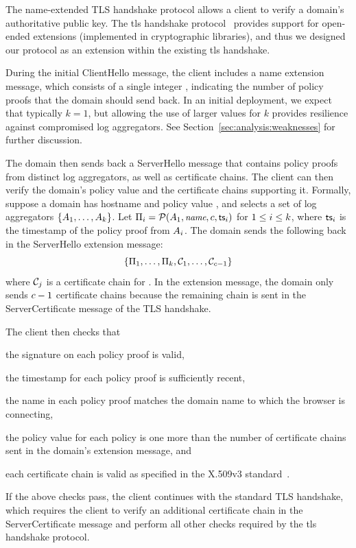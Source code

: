 The \ac{name}-extended TLS handshake protocol allows a client to verify a
domain's authoritative public key. The \ac{tls} handshake
protocol~\cite{rfc5246} provides support for open-ended extensions (implemented
in cryptographic libraries), and thus we designed our protocol as an extension
within the existing \ac{tls} handshake.

During the initial
  ClientHello message, the client includes a \ac{name} extension message, which
  consists of a single integer \numlas, indicating the number of policy proofs
  that the domain should send back.
In an initial deployment, we expect that typically $k=1$, but allowing the use
of larger values for $k$ provides resilience against compromised log
aggregators.  See Section~\ref{sec:analysis:weaknesses} for further discussion.

The domain then sends back a ServerHello message that contains
policy proofs from \numlas distinct log aggregators, as well as \policy
certificate chains.  The client can then verify the domain's policy value
and the certificate chains supporting it. Formally, suppose a domain has
hostname \hostname and policy value \policy, and selects a set of log
aggregators $\{A_1, \ldots, A_k\}$. Let $\Pi_i =
\mathcal{P}(A_1, \small{\emph{name}}, c, \textsf{ts}_i)$ for $1 \le i \le
k$, where $\textsf{ts}_i$ is the timestamp of the policy proof from
$A_i$. The domain sends the following back in the ServerHello
extension message:
\begin{equation}
  \{\Pi_1, \ldots, \Pi_k, \mathcal{C}_1,
  \ldots, \mathcal{C}_{c - 1}\}
\end{equation}
where $\mathcal{C}_j$ is a certificate chain for \hostname. In the extension
message, the domain only sends $c - 1$ certificate chains because the
remaining chain is sent in the ServerCertificate message of the TLS
handshake.

The client then checks that
\begin{inparaenum}
\item the signature on each policy proof is valid,
\item the timestamp for each policy proof is sufficiently recent,
\item the name in each policy proof matches the domain name to which 
      the browser is connecting,
\item the policy value for each policy is one more than the number of
  certificate chains sent in the domain's extension message, and
\item each certificate chain is valid as specified in the X.509v3
  standard~\cite{rfc5280}.
\end{inparaenum}
If the above checks pass, the client continues with the standard TLS
handshake, which requires the client to verify an additional certificate chain
in the ServerCertificate message and perform all other checks required by the
\ac{tls} handshake protocol.

